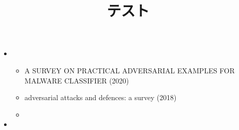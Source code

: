 \documentclass{article}
\title{テスト}
\author{}
\date{}
\begin{document}
\maketitle
\section{}
\begin{itemize}
  \item 
  \begin{itemize}
    \item A SURVEY ON PRACTICAL ADVERSARIAL EXAMPLES FOR MALWARE CLASSIFIER (2020)
    \item adversarial attacks and defences: a survey (2018)
    \item
  \end{itemize}
  \item
\end{itemize}
\end{document}
